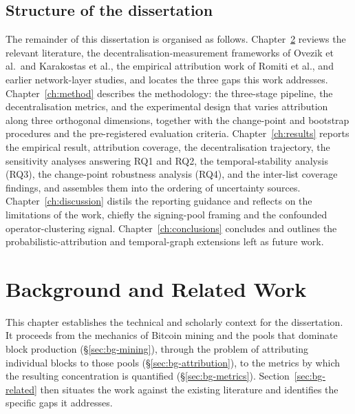 \documentclass[logo,msc]{infthesis}           %
\begin{document}
\section{Structure of the dissertation}
\label{sec:intro-structure}
 
The remainder of this dissertation is organised as follows.
Chapter~\ref{ch:background} reviews the relevant literature, the
decentralisation-measurement frameworks of Ovezik et al.\ and Karakostas et
al., the empirical attribution work of Romiti et al., and earlier
network-layer studies, and locates the three gaps this work addresses.
Chapter~\ref{ch:method} describes the methodology: the three-stage pipeline,
the decentralisation metrics, and the experimental design that varies
attribution along three orthogonal dimensions, together with the change-point
and bootstrap procedures and the pre-registered evaluation criteria.
Chapter~\ref{ch:results} reports the empirical result, attribution
coverage, the decentralisation trajectory, the sensitivity analyses answering
RQ1 and RQ2, the temporal-stability analysis (RQ3), the change-point
robustness analysis (RQ4), and the inter-list coverage findings, and
assembles them into the ordering of uncertainty sources.
Chapter~\ref{ch:discussion} distils the reporting guidance and reflects on the
limitations of the work, chiefly the signing-pool framing and the confounded
operator-clustering signal. Chapter~\ref{ch:conclusions} concludes and outlines
the probabilistic-attribution and temporal-graph extensions left as future
work.


\chapter{Background and Related Work}
\label{ch:background}
 
This chapter establishes the technical and scholarly context for the
dissertation. It proceeds from the mechanics of Bitcoin mining and the pools
that dominate block production (\S\ref{sec:bg-mining}), through the problem of
attributing individual blocks to those pools (\S\ref{sec:bg-attribution}), to
the metrics by which the resulting concentration is quantified
(\S\ref{sec:bg-metrics}). Section~\ref{sec:bg-related} then situates the work
against the existing literature and identifies the specific gaps it addresses.
 
\end{document}
